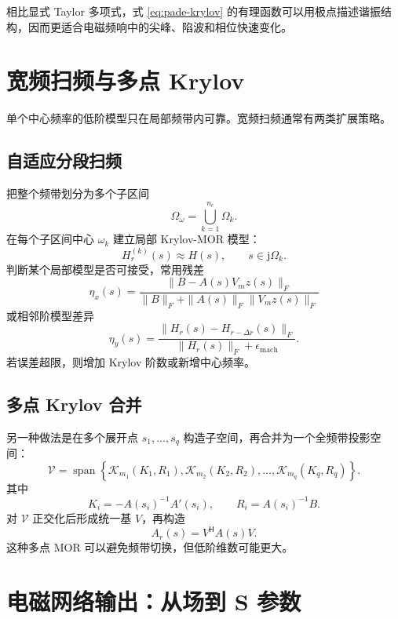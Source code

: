 \documentclass[UTF8,a4paper,11pt]{ctexart}
\newcommand{\jj}{\mathrm{j}}
\newcommand{\cK}{\mathcal{K}}
\newcommand{\herm}{\mathsf{H}}
\begin{document}
相比显式 Taylor 多项式，式 \eqref{eq:pade-krylov} 的有理函数可以用极点描述谐振结构，因而更适合电磁频响中的尖峰、陷波和相位快速变化。

\section{宽频扫频与多点 Krylov}

单个中心频率的低阶模型只在局部频带内可靠。宽频扫频通常有两类扩展策略。

\subsection{自适应分段扫频}

把整个频带划分为多个子区间
\[
    \Omega_\omega=\bigcup_{k=1}^{n_c}\Omega_k .
\]
在每个子区间中心 $\omega_k$ 建立局部 Krylov-MOR 模型：
\[
    H_r^{(k)}(s)\approx H(s),\qquad s\in \jj\Omega_k .
\]
判断某个局部模型是否可接受，常用残差
\begin{equation}
    \eta_x(s)=
    \frac{\|B-A(s)V_mz(s)\|_F}{\|B\|_F+\|A(s)\|_F\|V_mz(s)\|_F}
    \label{eq:residual}
\end{equation}
或相邻阶模型差异
\begin{equation}
    \eta_y(s)=
    \frac{\|H_{r}(s)-H_{r-\Delta r}(s)\|_F}
    {\|H_r(s)\|_F+\epsilon_{\mathrm{mach}}}.
    \label{eq:output-error}
\end{equation}
若误差超限，则增加 Krylov 阶数或新增中心频率。

\subsection{多点 Krylov 合并}

另一种做法是在多个展开点 $s_1,\ldots,s_q$ 构造子空间，再合并为一个全频带投影空间：
\begin{equation}
    \mathcal{V}
    =
    \operatorname{span}
    \left\{
    \cK_{m_1}(K_1,R_1),
    \cK_{m_2}(K_2,R_2),
    \ldots,
    \cK_{m_q}(K_q,R_q)
    \right\}.
    \label{eq:multipoint}
\end{equation}
其中
\[
    K_i=-A(s_i)^{-1}A'(s_i),\qquad
    R_i=A(s_i)^{-1}B .
\]
对 $\mathcal{V}$ 正交化后形成统一基 $V$，再构造
\[
    A_r(s)=V^{\herm}A(s)V .
\]
这种多点 MOR 可以避免频带切换，但低阶维数可能更大。

\section{电磁网络输出：从场到 S 参数}
\end{document}
